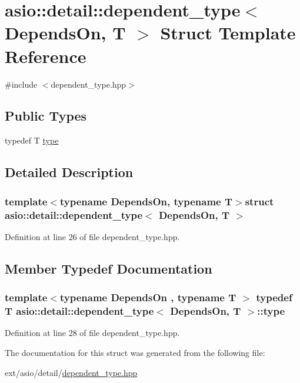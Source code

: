 \hypertarget{structasio_1_1detail_1_1dependent__type}{}\section{asio\+:\+:detail\+:\+:dependent\+\_\+type$<$ Depends\+On, T $>$ Struct Template Reference}
\label{structasio_1_1detail_1_1dependent__type}


{\ttfamily \#include $<$dependent\+\_\+type.\+hpp$>$}

\subsection*{Public Types}
\begin{DoxyCompactItemize}
\item 
typedef T \hyperlink{structasio_1_1detail_1_1dependent__type_a0086211bddc1f8292f039c25169cd41c}{type}
\end{DoxyCompactItemize}


\subsection{Detailed Description}
\subsubsection*{template$<$typename Depends\+On, typename T$>$struct asio\+::detail\+::dependent\+\_\+type$<$ Depends\+On, T $>$}



Definition at line 26 of file dependent\+\_\+type.\+hpp.



\subsection{Member Typedef Documentation}
\hypertarget{structasio_1_1detail_1_1dependent__type_a0086211bddc1f8292f039c25169cd41c}{}
\subsubsection[{type}]{\setlength{\rightskip}{0pt plus 5cm}template$<$typename Depends\+On , typename T $>$ typedef T {\bf asio\+::detail\+::dependent\+\_\+type}$<$ Depends\+On, T $>$\+::{\bf type}}\label{structasio_1_1detail_1_1dependent__type_a0086211bddc1f8292f039c25169cd41c}


Definition at line 28 of file dependent\+\_\+type.\+hpp.



The documentation for this struct was generated from the following file\+:\begin{DoxyCompactItemize}
\item 
ext/asio/detail/\hyperlink{dependent__type_8hpp}{dependent\+\_\+type.\+hpp}\end{DoxyCompactItemize}
